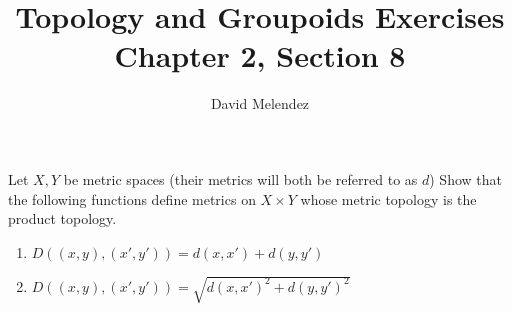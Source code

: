 \documentclass[12pt]{article}
\newenvironment{problem}[2][Problem]{\begin{trivlist}
\item[\hskip \labelsep {\bfseries #1}\hskip \labelsep {\bfseries #2.}]}{\end{trivlist}}
\begin{document}
\title{Topology and Groupoids Exercises\\ \large Chapter 2, Section 8}
\author{David Melendez}
\maketitle

\begin{problem}{8.3}
  Let $X,Y$ be metric spaces (their metrics will both be referred to as $d$)
  Show that the following functions define metrics on $X\times Y$
  whose metric topology is the product topology.
  \begin{enumerate}[label=(\alph*)]
    \item $D\left( (x,y),(x',y') \right)=d(x,x')+d(y,y')$ 
    \item $D\left( (x,y),(x',y') \right)=\sqrt{d(x,x')^2+d(y,y')^2}$
  \end{enumerate}
\end{problem}
\end{document}
